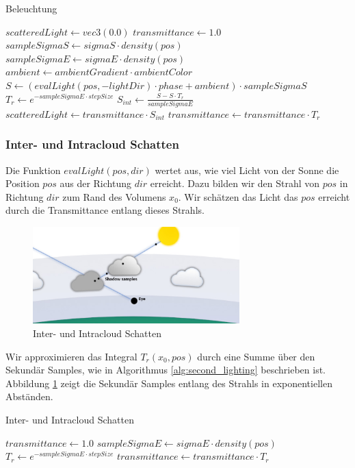 \begin{algorithm}[H]
\caption{Beleuchtung \cite{Högfeldt16}}
\label{alg:lighting}
\begin{algorithmic}[1]
\State $ scatteredLight \gets vec3(0.0) $
\State $ transmittance \gets 1.0 $
    \State $ sampleSigmaS \gets sigmaS \cdot density(pos) $
    \State $ sampleSigmaE \gets sigmaE \cdot density(pos) $
    \State $ ambient \gets ambientGradient \cdot ambientColor $
    \State $ S \gets (evalLight(pos, -lightDir) \cdot phase + ambient) \cdot sampleSigmaS $
    \State $ T_r \gets e^{-sampleSigmaE \cdot stepSize} $
    \State $ S_{int} \gets \frac{S - S \cdot T_r}{sampleSigmaE} $
    \State $ scatteredLight \gets transmittance \cdot S_{int} $
    \State $ transmittance \gets transmittance \cdot T_r $
\EndFor
\end{algorithmic}
\end{algorithm}

\subsubsection{Inter- und Intracloud Schatten}
Die Funktion $ evalLight(pos, dir) $ wertet aus, wie viel Licht von der Sonne die Position $ pos $ aus der Richtung $ dir $ erreicht. Dazu bilden wir den Strahl von $ pos $ in Richtung $ dir $ zum Rand des Volumens $ x_0 $. Wir schätzen das Licht das $ pos $ erreicht durch die Transmittance entlang dieses Strahls.

\begin{figure}[H]
    \centering
    \includegraphics[width=8cm]{media/cloud-shadow.png}
    \caption{Inter- und Intracloud Schatten \cite{Högfeldt16}}
    \label{fig:shadow}
\end{figure}

Wir approximieren das Integral $ T_r(x_0, pos) $ durch eine Summe über den Sekundär Samples, wie in Algorithmus \ref{alg:second_lighting} beschrieben ist. Abbildung \ref{fig:shadow} zeigt die Sekundär Samples entlang des Strahls in exponentiellen Abständen.

\begin{algorithm}[H]
\caption{Inter- und Intracloud Schatten}
\label{alg:second_lighting}
\begin{algorithmic}[1]
\State $ transmittance \gets 1.0 $
    \State $ sampleSigmaE \gets sigmaE \cdot density(pos) $
    \State $ T_r \gets e^{-sampleSigmaE \cdot stepSize} $
    \State $ transmittance \gets transmittance \cdot T_r $
\EndFor
\end{algorithmic}
\end{algorithm}

